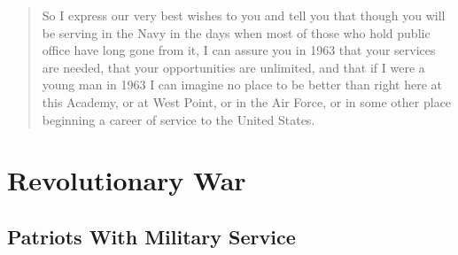 \documentclass[11pt,letter]{book}
\begin{document}
\begin{quotation}
So I express our very best wishes to you and tell you that though you will be serving in the Navy in the days when most of those who hold public office have long gone from it, I can assure you in 1963 that your services are needed, that your opportunities are unlimited, and that if I were a young man in 1963 I can imagine no place to be better than right here at this Academy, or at West Point, or in the Air Force, or in some other place beginning a career of service to the United States.
\end{quotation}

\chapter{Revolutionary War}

\section{Patriots With Military Service}
\end{document}
